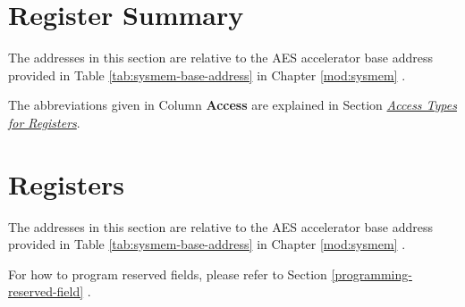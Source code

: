 \documentclass[main\_\_EN.tex]{subfiles}
\begin{document}




\clearpage
\hypertarget{aes-reg-summ}{}
\section{Register Summary}

The addresses in this section are relative to the AES accelerator base address provided in Table \ref{tab:sysmem-base-address} in Chapter \ref{mod:sysmem} \textit{}.

The abbreviations given in Column \textbf{Access} are explained in Section \hyperref[glossary-access-types]{\textit{Access Types for Registers}}.





\clearpage
\section{Registers}
The addresses in this section are relative to the AES accelerator base address provided in Table \ref{tab:sysmem-base-address} in Chapter \ref{mod:sysmem} \textit{}.

For how to program reserved fields, please refer to Section \ref{programming-reserved-field} \textit{}.


\end{document}
